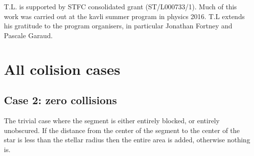 \documentclass[a4paper,fleqn,usenatbib]{mnras}
\begin{document}
T.L. is supported by STFC consolidated grant (ST/L000733/1). Much of this work was carried out at the kavli summer program in physics 2016. T.L extends his gratitude to the program organisers, in particular Jonathan Fortney and Pascale Garaud.





%






\appendix

\section{All colision cases}

\subsection*{Case 2: zero collisions}
The trivial case where the segment is either entirely blocked, or entirely unobscured. If the distance from the center of the segment to the center of the star is less than the stellar radius then the entire area is added, otherwise nothing is.
\end{document}
